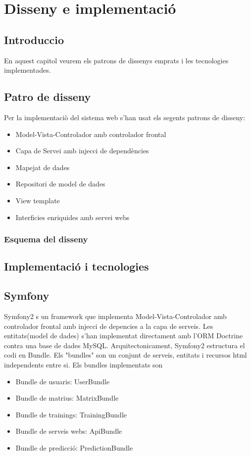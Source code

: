\chapter{Disseny e implementaci\'{o}}
\label{cha:dessign}

\section{Introduccio}
En aquest capitol veurem els patrons de dissenys emprats i les tecnologies implementades.

\section{Patro de disseny}
Per la implementaci\`{o} del sistema web s'han usat els segents patrons de disseny:
  \begin{itemize}
  \item Model-Vista-Controlador amb controlador frontal
  \item Capa de Servei amb injecci de depend\`{e}ncies
  \item Mapejat de dades
  \item Repositori de model de dades
  \item View template
  \item Interficies enriquides amb servei webs
  \end{itemize}

\subsection{Esquema del disseny}

\section{Implementaci\'{o} i tecnologies}
\section{Symfony}
Symfony2 s un framework que implementa Model-Vista-Controlador amb controlador frontal amb injecci de depencies a la capa de serveis. Les entitats(model de dades) s'han implementat directament amb l'ORM Doctrine contra una base de dades MySQL.
Arquitectonicament, Symfony2 estructura el codi en Bundle. Els "bundles" son un conjunt de serveis, entitats i recursos html independents entre si. Els bundles implementats son
\begin{itemize}
\item{Bundle de usuaris: UserBundle}
\item{Bundle de matrius: MatrixBundle}
\item{Bundle de trainings: TrainingBundle}
\item{Bundle de serveis webs: ApiBundle}
\item{Bundle de predicci\'{o}: PredictionBundle}
\end{itemize}

